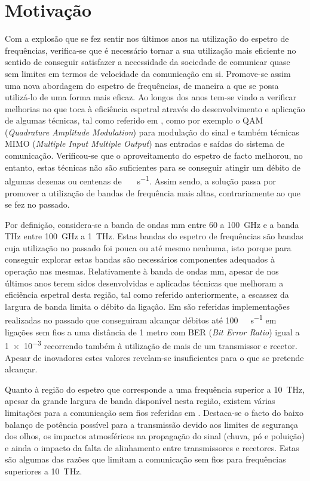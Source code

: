 \section{Motivação} \label{sec:goals}
Com a explosão que se fez sentir nos últimos anos na utilização do espetro de frequências, verifica-se que é necessário tornar a sua utilização mais eficiente no sentido de conseguir satisfazer a necessidade da sociedade de comunicar quase sem limites em termos de velocidade da comunicação em si. Promove-se assim uma nova abordagem do espetro de frequências, de maneira a que se possa utilizá-lo de uma forma mais eficaz.  
Ao longos dos anos tem-se vindo a verificar melhorias no que toca à eficiência espetral através do desenvolvimento e aplicação de algumas técnicas, tal como referido em \cite{R007}, como por exemplo o QAM (\textit{Quadrature Amplitude Modulation}) para modulação do sinal e também técnicas MIMO (\textit{Multiple Input Multiple Output}) nas entradas e saídas do sistema de comunicação. Verificou-se que o aproveitamento do espetro de facto melhorou, no entanto, estas técnicas não são suficientes para se conseguir atingir um débito de algumas dezenas ou centenas de \SI{}{\giga\bit\per\second}. Assim sendo, a solução passa por promover a utilização de bandas de frequência mais altas, contrariamente ao que se fez no passado.  

Por definição, considera-se a banda de ondas mm entre 60 a \SI{100}{\giga\hertz} e a banda THz entre \SI{100}{\giga\hertz} a \SI{1}{\tera\hertz}. Estas bandas do espetro de frequências são bandas cuja utilização no passado foi pouca ou até mesmo nenhuma, isto porque para conseguir explorar estas bandas são necessários componentes adequados à operação nas mesmas. Relativamente à banda de ondas mm, apesar de nos últimos anos terem sidos desenvolvidas e aplicadas técnicas que melhoram a eficiência espetral desta região, tal como referido anteriormente, a escassez da largura de banda limita o débito da ligação. Em \cite{R007} são referidas implementações realizadas no passado que conseguiram alcançar débitos até  \SI{100}{\giga\bit\per\second} em ligações sem fios a uma distância de 1 metro com BER (\textit{Bit Error Ratio}) igual a \num{1e-3} recorrendo também à utilização de mais de um transmissor e recetor. Apesar de inovadores estes valores revelam-se insuficientes para o que se pretende alcançar. 

Quanto à região do espetro que corresponde a uma frequência superior a \SI{10}{\tera\hertz}, apesar da grande largura de banda disponível nesta região, existem várias limitações para a comunicação sem fios referidas em \cite{R005}. Destaca-se o facto do baixo balanço de potência possível para a transmissão devido aos limites de segurança dos olhos, os impactos atmosféricos na propagação do sinal (chuva, pó e poluição) e ainda o impacto da falta de alinhamento entre transmissores e recetores. Estas são algumas das razões que limitam a comunicação sem fios para frequências superiores a \SI{10}{\tera\hertz}.

